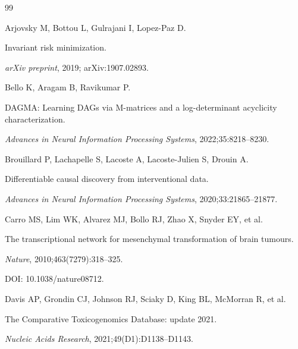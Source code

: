 \documentclass[12pt,a4paper]{article}
\begin{document}
\begin{thebibliography}{99}




Arjovsky M, Bottou L, Gulrajani I, Lopez-Paz D.




Invariant risk minimization.




\textit{arXiv preprint}, 2019; arXiv:1907.02893.




Bello K, Aragam B, Ravikumar P.




DAGMA: Learning DAGs via M-matrices and a log-determinant acyclicity characterization.




\textit{Advances in Neural Information Processing Systems}, 2022;35:8218--8230.




Brouillard P, Lachapelle S, Lacoste A, Lacoste-Julien S, Drouin A.




Differentiable causal discovery from interventional data.




\textit{Advances in Neural Information Processing Systems}, 2020;33:21865--21877.




Carro MS, Lim WK, Alvarez MJ, Bollo RJ, Zhao X, Snyder EY, et al.




The transcriptional network for mesenchymal transformation of brain tumours.




\textit{Nature}, 2010;463(7279):318--325.




DOI: 10.1038/nature08712.




Davis AP, Grondin CJ, Johnson RJ, Sciaky D, King BL, McMorran R, et al.




The Comparative Toxicogenomics Database: update 2021.




\textit{Nucleic Acids Research}, 2021;49(D1):D1138--D1143.




\end{thebibliography}
\end{document}
